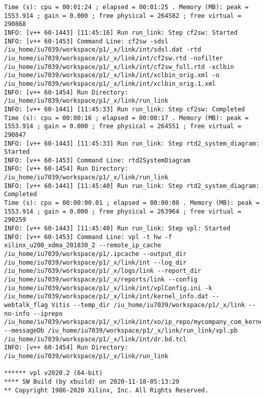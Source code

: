 \begin{lstlisting}[label=lst:lev_rec,caption=Содержимое log-файла]
Time (s): cpu = 00:01:24 ; elapsed = 00:01:25 . Memory (MB): peak = 1553.914 ; gain = 0.000 ; free physical = 264582 ; free virtual = 290868
INFO: [v++ 60-1443] [11:45:16] Run run_link: Step cf2sw: Started
INFO: [v++ 60-1453] Command Line: cf2sw -sdsl /iu_home/iu7039/workspace/p1/_x/link/int/sdsl.dat -rtd /iu_home/iu7039/workspace/p1/_x/link/int/cf2sw.rtd -nofilter /iu_home/iu7039/workspace/p1/_x/link/int/cf2sw_full.rtd -xclbin /iu_home/iu7039/workspace/p1/_x/link/int/xclbin_orig.xml -o /iu_home/iu7039/workspace/p1/_x/link/int/xclbin_orig.1.xml
INFO: [v++ 60-1454] Run Directory: /iu_home/iu7039/workspace/p1/_x/link/run_link
INFO: [v++ 60-1441] [11:45:33] Run run_link: Step cf2sw: Completed
Time (s): cpu = 00:00:16 ; elapsed = 00:00:17 . Memory (MB): peak = 1553.914 ; gain = 0.000 ; free physical = 264551 ; free virtual = 290847
INFO: [v++ 60-1443] [11:45:33] Run run_link: Step rtd2_system_diagram: Started
INFO: [v++ 60-1453] Command Line: rtd2SystemDiagram
INFO: [v++ 60-1454] Run Directory: /iu_home/iu7039/workspace/p1/_x/link/run_link
INFO: [v++ 60-1441] [11:45:40] Run run_link: Step rtd2_system_diagram: Completed
Time (s): cpu = 00:00:00.01 ; elapsed = 00:00:08 . Memory (MB): peak = 1553.914 ; gain = 0.000 ; free physical = 263964 ; free virtual = 290259
INFO: [v++ 60-1443] [11:45:40] Run run_link: Step vpl: Started
INFO: [v++ 60-1453] Command Line: vpl -t hw -f xilinx_u200_xdma_201830_2 --remote_ip_cache /iu_home/iu7039/workspace/p1/.ipcache --output_dir /iu_home/iu7039/workspace/p1/_x/link/int --log_dir /iu_home/iu7039/workspace/p1/_x/logs/link --report_dir /iu_home/iu7039/workspace/p1/_x/reports/link --config /iu_home/iu7039/workspace/p1/_x/link/int/vplConfig.ini -k /iu_home/iu7039/workspace/p1/_x/link/int/kernel_info.dat --webtalk_flag Vitis --temp_dir /iu_home/iu7039/workspace/p1/_x/link --no-info --iprepo /iu_home/iu7039/workspace/p1/_x/link/int/xo/ip_repo/mycompany_com_kernel_rtl_kernel_wizard_0_1_0 --messageDb /iu_home/iu7039/workspace/p1/_x/link/run_link/vpl.pb /iu_home/iu7039/workspace/p1/_x/link/int/dr.bd.tcl
INFO: [v++ 60-1454] Run Directory: /iu_home/iu7039/workspace/p1/_x/link/run_link

****** vpl v2020.2 (64-bit)
**** SW Build (by xbuild) on 2020-11-18-05:13:29
** Copyright 1986-2020 Xilinx, Inc. All Rights Reserved.


\end{lstlisting}
